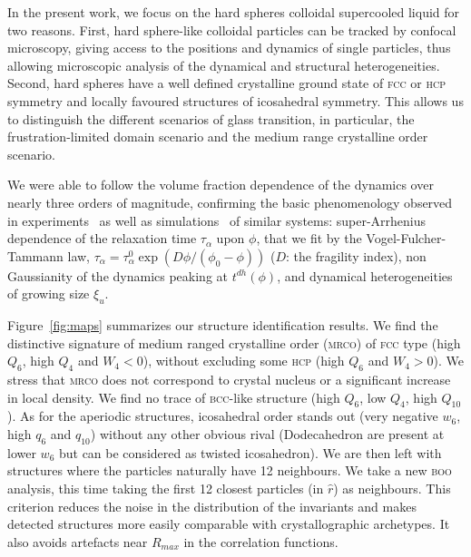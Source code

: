 In the present work, we focus on the hard spheres colloidal supercooled liquid for two reasons. First, hard sphere-like colloidal particles can be tracked by confocal microscopy, giving access to the positions and dynamics of single particles, thus allowing microscopic analysis of the dynamical and structural heterogeneities. Second, hard spheres have a well defined crystalline ground state of \textsc{fcc} or \textsc{hcp} symmetry and locally favoured structures of icosahedral symmetry. This allows us to distinguish the different scenarios of glass transition, in particular, the frustration-limited domain scenario and the medium range crystalline order scenario.



We were able to follow the volume fraction dependence of the dynamics over nearly three orders of magnitude, confirming the basic phenomenology observed in experiments~\citep{pusey1987ogt, kegel2000swe, weeks2000, Berthier2005} as well as simulations~\citep{Kawasaki2010} of similar systems: super-Arrhenius dependence of the relaxation time $\tau_\alpha$ upon $\phi$, that we fit by the Vogel-Fulcher-Tammann law, 
$\tau_\alpha=\tau_\alpha^0 \exp(D\phi/(\phi_0-\phi))$ ($D$: the fragility index), non Gaussianity of the dynamics peaking at $t^{dh}(\phi)$, and dynamical heterogeneities of growing size $\xi_u$.



Figure~\ref{fig:maps} summarizes our structure identification results. We find the distinctive signature of medium ranged crystalline order (\textsc{mrco}) of \textsc{fcc} type (high $Q_6$, high $Q_4$ and $W_4<0$), without excluding some \textsc{hcp} (high $Q_6$ and $W_4>0$). We stress that \textsc{mrco} does not correspond to crystal nucleus or a significant increase in local density. We find no trace of \textsc{bcc}-like structure (high $Q_6$, low $Q_4$, high $Q_{10}$). As for the aperiodic structures, icosahedral order stands out (very negative $w_6$, high $q_6$ and $q_{10}$) without any other obvious rival (Dodecahedron are present at lower $w_6$ but can be considered as twisted icosahedron). We are then left with structures where the particles naturally have 12 neighbours. We take a new \textsc{boo} analysis, this time taking the first 12 closest particles (in $\hat{r}$) as neighbours. This criterion reduces the noise in the distribution of the invariants and makes detected structures more easily comparable with crystallographic archetypes. It also avoids artefacts near $R_{max}$ in the correlation functions.



